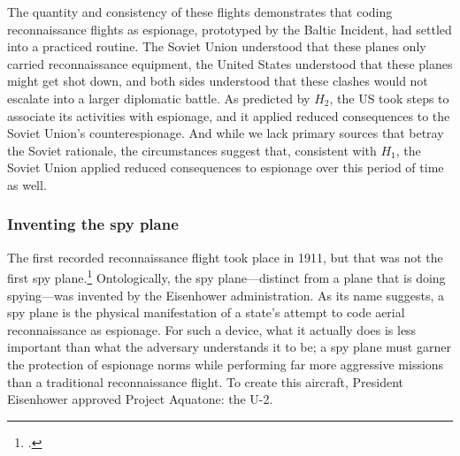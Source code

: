 \documentclass[14pt]{extarticle}
\begin{document}
The quantity and consistency of these flights demonstrates that coding reconnaissance flights as espionage, prototyped by the Baltic Incident, had settled into a practiced routine. The Soviet Union understood that these planes only carried reconnaissance equipment, the United States understood that these planes might get shot down, and both sides understood that these clashes would not escalate into a larger diplomatic battle. As predicted by $H_2$, the US took steps to associate its activities with espionage, and it applied reduced consequences to the Soviet Union's counterespionage. And while we lack primary sources that betray the Soviet rationale, the circumstances suggest that, consistent with $H_1$, the Soviet Union applied reduced consequences to espionage over this period of time as well.

\subsubsection{Inventing the spy plane}

The first recorded reconnaissance flight took place in 1911, but that was not the first spy plane.\footcite[Surveilling the Turkish infantry near Tripoli, \enquote{Lieut. Piazzi today, for the first time in the history of warfare, made from this place an aerial reconnaissance against a hostile power}]{special_cable_to_the_new_york_times_air_1911} Ontologically, the spy plane---distinct from a plane that is doing spying---was invented by the Eisenhower administration. As its name suggests, a spy plane is the physical manifestation of a state's attempt to code aerial reconnaissance as espionage. For such a device, what it actually does is less important than what the adversary understands it to be; a spy plane must garner the protection of espionage norms while performing far more aggressive missions than a traditional reconnaissance flight. To create this aircraft, President Eisenhower approved Project Aquatone: the U-2.
\end{document}
